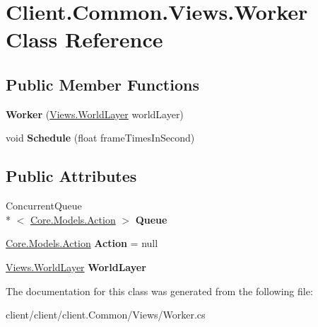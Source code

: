 \hypertarget{classClient_1_1Common_1_1Views_1_1Worker}{\section{Client.\-Common.\-Views.\-Worker Class Reference}
\label{classClient_1_1Common_1_1Views_1_1Worker}
}
\subsection*{Public Member Functions}
\begin{DoxyCompactItemize}
\item 
\hypertarget{classClient_1_1Common_1_1Views_1_1Worker_a0914012575e1fd70a9bbeb819dc71912}{{\bfseries Worker} (\hyperlink{classClient_1_1Common_1_1Views_1_1WorldLayer}{Views.\-World\-Layer} world\-Layer)}\label{classClient_1_1Common_1_1Views_1_1Worker_a0914012575e1fd70a9bbeb819dc71912}

\item 
\hypertarget{classClient_1_1Common_1_1Views_1_1Worker_a2d11d9c1897409b49838113d58621940}{void {\bfseries Schedule} (float frame\-Times\-In\-Second)}\label{classClient_1_1Common_1_1Views_1_1Worker_a2d11d9c1897409b49838113d58621940}

\end{DoxyCompactItemize}
\subsection*{Public Attributes}
\begin{DoxyCompactItemize}
\item 
\hypertarget{classClient_1_1Common_1_1Views_1_1Worker_a0994155b4af488be620e43884074ef3d}{Concurrent\-Queue\\*
$<$ \hyperlink{classCore_1_1Models_1_1Action}{Core.\-Models.\-Action} $>$ {\bfseries Queue}}\label{classClient_1_1Common_1_1Views_1_1Worker_a0994155b4af488be620e43884074ef3d}

\item 
\hypertarget{classClient_1_1Common_1_1Views_1_1Worker_a2363fe6b4fc0e8978dc53fb9bce676e1}{\hyperlink{classCore_1_1Models_1_1Action}{Core.\-Models.\-Action} {\bfseries Action} = null}\label{classClient_1_1Common_1_1Views_1_1Worker_a2363fe6b4fc0e8978dc53fb9bce676e1}

\item 
\hypertarget{classClient_1_1Common_1_1Views_1_1Worker_af01ec626a8929a469606d68f1f7d18c1}{\hyperlink{classClient_1_1Common_1_1Views_1_1WorldLayer}{Views.\-World\-Layer} {\bfseries World\-Layer}}\label{classClient_1_1Common_1_1Views_1_1Worker_af01ec626a8929a469606d68f1f7d18c1}

\end{DoxyCompactItemize}


The documentation for this class was generated from the following file\-:\begin{DoxyCompactItemize}
\item 
client/client/client.\-Common/\-Views/Worker.\-cs\end{DoxyCompactItemize}
